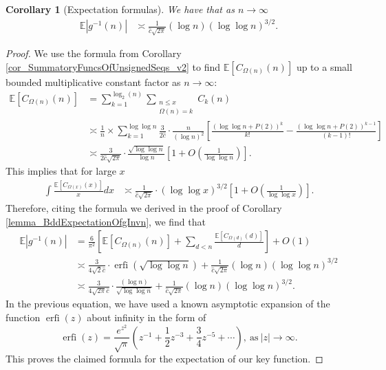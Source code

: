 \documentclass[11pt,reqno,a4letter]{article}
\numberwithin{figure}{section}
\numberwithin{table}{section}
\theoremstyle{plain}
\newtheorem{cor}[theorem]{Corollary}
\numberwithin{theorem}{section}
\theoremstyle{definition}
\begin{document}
\begin{cor}[Expectation formulas] 
\label{cor_ExpectationFormulaAbsgInvn_v2} 
We have that as $n \rightarrow \infty$ 
\begin{align*} 
\mathbb{E}|g^{-1}(n)| & \asymp \frac{1}{\hat{c} \sqrt{2\pi}} (\log n) (\log\log n)^{3/2}. 
\end{align*} 
\end{cor} 
\begin{proof} 
We use the formula from Corollary \ref{cor_SummatoryFuncsOfUnsignedSeqs_v2} 
to find $\mathbb{E}[C_{\Omega(n)}(n)]$ up to a small bounded multiplicative 
constant factor as $n \rightarrow \infty$: 
\begin{align*} 
\mathbb{E}[C_{\Omega(n)}(n)] & = 
     \sum_{k=1}^{\log_2(n)} \sum_{\substack{n \leq x \\ \Omega(n) = k}} C_k(n) \\ 
     & \asymp \frac{1}{n} \times 
     \sum_{k=1}^{\log\log n} \frac{3}{2\hat{c}} \cdot \frac{n}{(\log n)^2} \left[ 
     \frac{(\log\log n + P(2))^{k}}{k!} - \frac{(\log\log n + P(2))^{k-1}}{(k-1)!}
     \right] \\ 
     & \asymp \frac{3}{2\hat{c} \sqrt{2\pi}} \cdot \frac{\sqrt{\log\log n}}{\log n}\left[1 + 
     O\left(\frac{1}{\log\log n}\right)\right]. 
\end{align*} 
This implies that for large $x$ 
\begin{align*} 
\int \frac{\mathbb{E}[C_{\Omega(x)}(x)]}{x} dx & \asymp 
     \frac{1}{\hat{c} \sqrt{2\pi}} \cdot (\log\log x)^{3/2} \left[1 + 
     O\left(\frac{1}{\log\log x}\right)\right]. 
\end{align*} 
Therefore, citing the formula we derived in the proof of 
Corollary \ref{lemma_BddExpectationOfgInvn}, we find that 
\begin{align*} 
\mathbb{E}|g^{-1}(n)| & = \frac{6}{\pi^2}\left[\mathbb{E}[C_{\Omega(n)}(n)] + 
     \sum_{d<n} \frac{\mathbb{E}[C_{\Omega(d)}(d)]}{d}\right] + O(1) \\ 
     & \asymp \frac{3}{4\sqrt{2} \hat{c}} \cdot \operatorname{erfi}\left(\sqrt{\log\log n}\right) + 
     \frac{1}{\hat{c} \sqrt{2\pi}} (\log n) (\log\log n)^{3/2} \\ 
     & \asymp \frac{3}{4\sqrt{2\pi} \hat{c}} \cdot \frac{(\log n)}{\sqrt{\log\log n}} + 
     \frac{1}{\hat{c} \sqrt{2\pi}} (\log n) (\log\log n)^{3/2}. 
\end{align*} 
In the previous equation, we have used a known asymptotic expansion of the function $\operatorname{erfi}(z)$ 
about infinity in the form of \cite[\S 3.2]{INCGAMMA-BOOK} 
\[
\operatorname{erfi}(z) = \frac{e^{z^2}}{\sqrt{\pi}} \left(z^{-1} + \frac{1}{2}z^{-3} + \frac{3}{4}z^{-5} + \cdots \right), 
     \mathrm{\ as\ } |z| \rightarrow \infty. 
\]
This proves the claimed formula for the expectation of our key function. 
\end{proof} 
\end{document}
